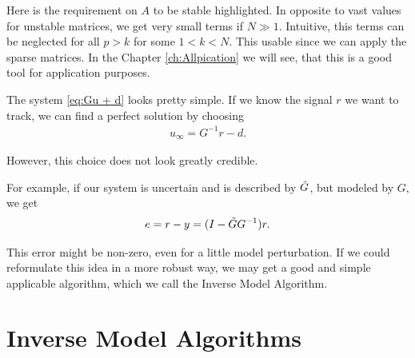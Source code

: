 Here is the requirement on $A$ to be stable highlighted. In opposite to vast values for unstable matrices, we get very small terms if $N \gg 1$. Intuitive, this terms can be neglected for all $p > k$ for some $1<k<N$. This usable since we can apply the sparse matrices. In the Chapter \ref{ch:Allpication} we will see, that this is a good tool for application purposes. 

The system \eqref{eq:Gu + d} looks pretty simple. 
If we know the signal $r$ we want to track, we can find a perfect solution by choosing 
\begin{align}
u_\infty = G^{-1} r -d.
\end{align}

However, this choice does not look greatly  credible. 

For example, if our system is uncertain and is described by $\tilde{G}$, but modeled by $G$, we get 
\begin{align}
e = r - y = (I - \tilde{G} G^{-1} ) r. 
\end{align}

This error might be non-zero, even for a little model perturbation. 
If we could reformulate this idea in a more robust way, we may get a good and simple applicable algorithm, which we call the Inverse Model Algorithm.

\section{Inverse Model Algorithms}

